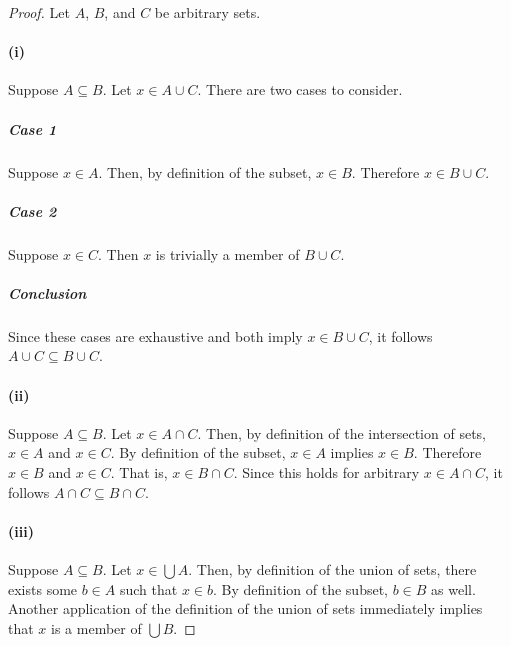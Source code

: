 \documentclass{report}
\begin{document}
  \begin{proof}

    Let $A$, $B$, and $C$ be arbitrary sets.

    \paragraph{(i)}%

      Suppose $A \subseteq B$.
      Let $x \in A \cup C$.
      There are two cases to consider.

      \subparagraph{Case 1}%

        Suppose $x \in A$.
        Then, by definition of the subset, $x \in B$.
        Therefore $x \in B \cup C$.

      \subparagraph{Case 2}%

        Suppose $x \in C$.
        Then $x$ is trivially a member of $B \cup C$.

      \subparagraph{Conclusion}%

        Since these cases are exhaustive and both imply $x \in B \cup C$, it
          follows $A \cup C \subseteq B \cup C$.

    \paragraph{(ii)}%

      Suppose $A \subseteq B$.
      Let $x \in A \cap C$.
      Then, by definition of the intersection of sets, $x \in A$ and $x \in C$.
      By definition of the subset, $x \in A$ implies $x \in B$.
      Therefore $x \in B$ and $x \in C$.
      That is, $x \in B \cap C$.
      Since this holds for arbitrary $x \in A \cap C$, it follows
        $A \cap C \subseteq B \cap C$.

    \paragraph{(iii)}%

      Suppose $A \subseteq B$.
      Let $x \in \bigcup A$.
      Then, by definition of the union of sets, there exists some $b \in A$ such
        that $x \in b$.
      By definition of the subset, $b \in B$ as well.
      Another application of the definition of the union of sets immediately
        implies that $x$ is a member of $\bigcup B$.

  \end{proof}

\subsection{}%
\end{document}
